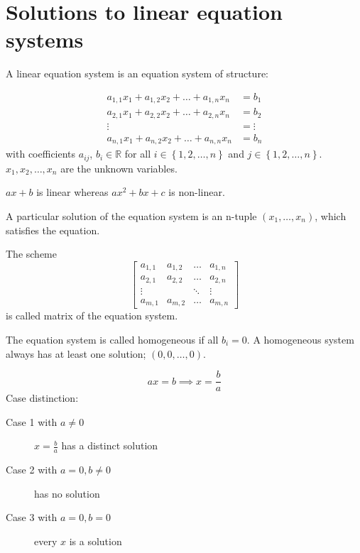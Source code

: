 \documentclass[a4paper,landscape,twocolumn]{article}
\newcommand\set[1]{\left\{#1\right\}}
\begin{document}
\section{Solutions to linear equation systems}

A linear equation system is an equation system of structure:

\begin{align*}
  a_{1,1} x_1 + a_{1,2} x_2 + \ldots + a_{1,n} x_n &= b_1 \\
  a_{2,1} x_1 + a_{2,2} x_2 + \ldots + a_{2,n} x_n &= b_2 \\
    \vdots                                     &= \vdots \\
  a_{n,1} x_1 + a_{n,2} x_2 + \ldots + a_{n,n} x_n &= b_n
\end{align*}
with coefficients $a_{ij}$, $b_i \in \mathbb{R}$ for all $i \in \set{1,2,\ldots,n}$ and $j \in \set{1,2,\ldots,n}$.
$x_1,x_2,\ldots,x_n$ are the unknown variables.

$ax+b$ is linear whereas $ax^2 + bx + c$ is non-linear.

A particular solution of the equation system is an n-tuple $(x_1, \ldots, x_n)$,
which satisfies the equation.

The scheme
\begin{displaymath}
  \begin{bmatrix}
    a_{1,1} & a_{1,2} & \ldots & a_{1,n} \\
    a_{2,1} & a_{2,2} & \ldots & a_{2,n} \\
    \vdots &        & \ddots & \vdots \\
    a_{m,1} & a_{m,2} & \ldots & a_{m,n}
  \end{bmatrix}
\end{displaymath}
is called matrix of the equation system.

The equation system is called homogeneous if all $b_i = 0$.
A homogeneous system always has at least one solution; $(0, 0, \ldots, 0)$.

\[ ax = b \implies x = \frac ba \]
Case distinction:
\begin{description}
  \item[Case 1 with $a \neq 0$]
    $x = \frac ba$ has a distinct solution
  \item[Case 2 with $a = 0, b \neq 0$]
    has no solution
  \item[Case 3 with $a = 0, b = 0$]
    every $x$ is a solution
\end{description}
\end{document}
